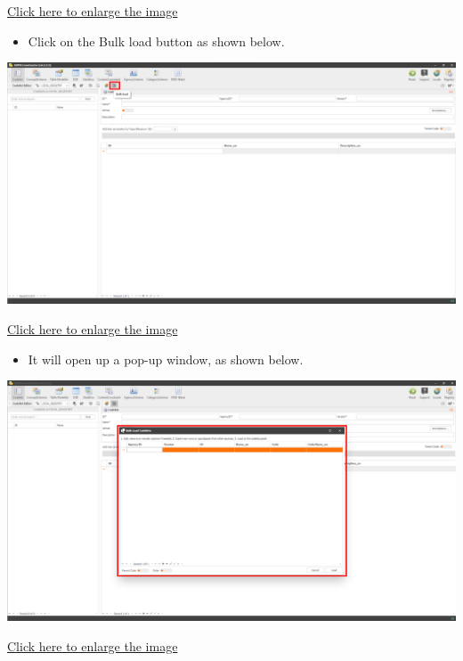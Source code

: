 \documentclass[
]{book}
\providecommand{\tightlist}{%
  \setlength{\itemsep}{0pt}\setlength{\parskip}{0pt}}
\theoremstyle{definition}
\theoremstyle{definition}
\theoremstyle{definition}
\theoremstyle{definition}
\theoremstyle{remark}
\begin{document}
\href{images/image082.png}{Click here to enlarge the image}

\begin{itemize}
\tightlist
\item
  Click on the Bulk load button as shown below.
\end{itemize}

\begin{center}\includegraphics[width=1\linewidth]{./images/image084} \end{center}

\href{images/image084.png}{Click here to enlarge the image}

\begin{itemize}
\tightlist
\item
  It will open up a pop-up window, as shown below.
\end{itemize}

\begin{center}\includegraphics[width=1\linewidth]{./images/image086} \end{center}

\href{images/image086.png}{Click here to enlarge the image}
\end{document}
